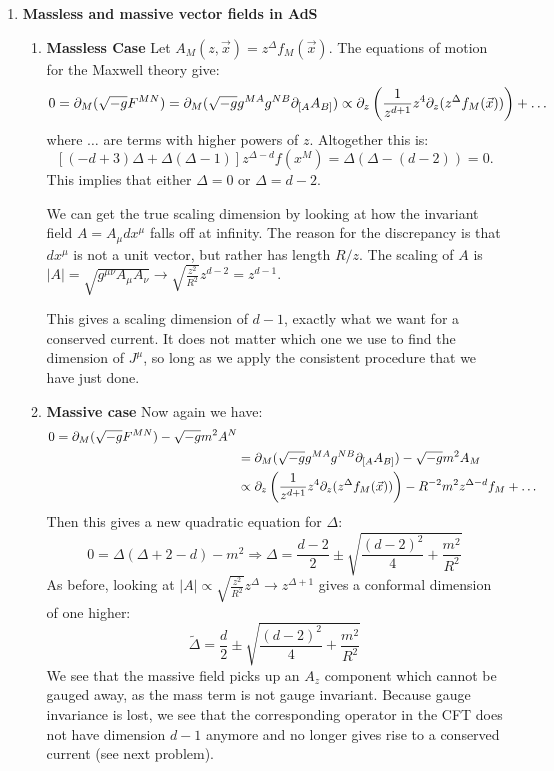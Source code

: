 \documentclass[11pt, class=article, crop=false]{standalone}
\begin{document}
\begin{enumerate}
	\item \textbf{Massless and massive vector fields in AdS}
	\begin{enumerate}
		\item \textbf{Massless Case} Let $A_M (z, \vec x) = z^{\Delta} f_M(\vec x)$. The equations of motion for the Maxwell theory give:
		\[
			0 = \partial_M (\sqrt{-g} F^{MN}) = \partial_M (\sqrt{-g} g^{M A} g^{N B} \partial_{\small[ A} A_{B\small]}) \propto \partial_{z} \left( \frac{1}{z^{d+1}} z^{4} \partial_{z} (z^{\Delta} f_M(\vec x)) \right) + \dots
		\]
		 where $\dots$ are terms with higher powers of $z$. Altogether this is:
		 \[
		 	[(-d+3)\Delta + \Delta(\Delta-1)] z^{\Delta - d} f(x^M) = \Delta(\Delta - (d - 2)) = 0.
		 \]
		 This implies that either $\Delta = 0$ or $\Delta = d-2$.
		
		 
		We can get the true scaling dimension by looking at how the invariant field $A = A_\mu dx ^\mu$ falls off at infinity. The reason for the discrepancy is that $dx^\mu$ is not a unit vector, but rather has length $R/z$. The scaling of $A$ is $|A| = \sqrt{g^{\mu \nu} A_\mu A_\nu} \to \sqrt{\frac{z^2}{R^2}} z^{d-2} = z^{d-1}$.
		
		This gives a scaling dimension of $d-1$, exactly what we want for a conserved current. 
		It does not matter which one we use to find the dimension of $J^\mu$, so long as we apply the consistent procedure that we have just done. 
		
		\item \textbf{Massive case} Now again we have:
		\[
		\begin{aligned}
			0 = \partial_M (\sqrt{-g} F^{MN}) - \sqrt{-g} m^2 A^N\\
			& = \partial_M (\sqrt{-g} g^{MA} g^{NB} \partial_{\small[ A} A_{B\small]}) - \sqrt{-g} m^2 A_M\\
			 &\propto \partial_{z} \left( \frac{1}{z^{d+1}} z^{4} \partial_{z} (z^{\Delta} f_M(\vec x)) \right) - R^{-2} m^2 z^{\Delta-d} f_M + \dots
		\end{aligned}
		\]
		Then this gives a new quadratic equation for $\Delta$:
		\[
			0 = \Delta (\Delta + 2 - d) - m^2 \Rightarrow \Delta = \frac{d-2}{2} \pm \sqrt{\frac{(d-2)^2}{4} + \frac{m^2}{R^2}} 
		\]
		 As before, looking at $|A| \propto \sqrt{\frac{z^2}{R^2}} z^\Delta \to z^{\Delta + 1}$ gives a conformal dimension of one higher:
		\[
			\tilde \Delta = \frac{d}{2} \pm \sqrt{\frac{(d-2)^2}{4} + \frac{m^2}{R^2}} 
		\]
		We see that the massive field picks up an $A_z$ component which cannot be gauged away, as the mass term is not gauge invariant. Because gauge invariance is lost, we see that the corresponding operator in the CFT does not have dimension $d-1$ anymore and no longer gives rise to a conserved current (see next problem). 
		

\end{enumerate}
\end{enumerate}
\end{document}
